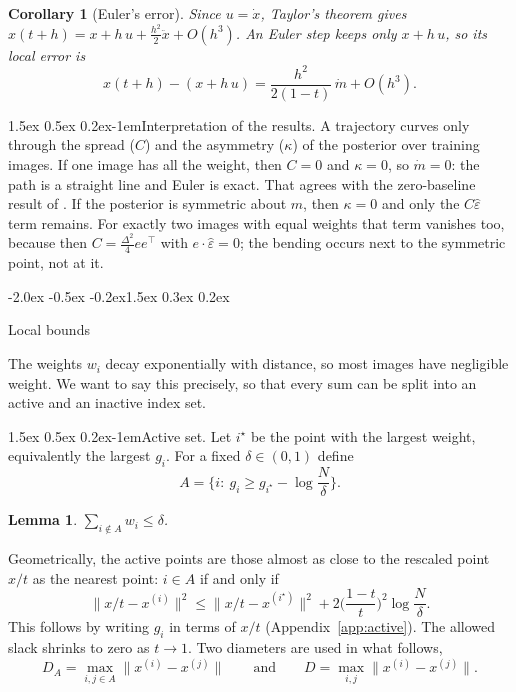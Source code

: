 \documentclass{article}
\makeatletter
\renewcommand{\normalsize}{\fontsize{10pt}{11pt}\selectfont}
\renewcommand{\section}{\@startsection{section}{1}{\z@}%
  {-2.0ex \@plus -0.5ex \@minus -0.2ex}{1.5ex \@plus 0.3ex \@minus 0.2ex}{\large\bfseries\raggedright}}
\renewcommand{\paragraph}{\@startsection{paragraph}{4}{\z@}%
  {1.5ex \@plus 0.5ex \@minus 0.2ex}{-1em}{\normalsize\bfseries}}
\newtheorem{lemma}{Lemma}
\newtheorem{corollary}{Corollary}
\theoremstyle{remark}
\newcommand{\xn}[1]{x^{(#1)}}
\newcommand{\eps}{\hat\varepsilon}
\makeatother
\begin{document}
\begin{corollary}[Euler's error]\label{cor:euler}
Since $u = \dot x$, Taylor's theorem gives $x(t + h) = x + h\,u + \frac{h^2}{2}\ddot x + O(h^3)$. An Euler step keeps only $x + h\,u$, so its local error is
\begin{equation}\label{eq:euler}
  x(t + h) - (x + h\,u) = \frac{h^2}{2(1 - t)}\,\dot m + O(h^3).
\end{equation}
\end{corollary}

\paragraph{Interpretation of the results.} A trajectory curves only through the spread ($C$) and the asymmetry ($\kappa$) of the posterior over training images. If one image has all the weight, then $C = 0$ and $\kappa = 0$, so $\dot m = 0$: the path is a straight line and Euler is exact. That agrees with the zero-baseline result of \citet{rao2026geometry}. If the posterior is symmetric about $m$, then $\kappa = 0$ and only the $C\eps$ term remains. For exactly two images with equal weights that term vanishes too, because then $C = \frac{\Delta^2}{4}ee^\top$ with $e \cdot \eps = 0$; the bending occurs next to the symmetric point, not at it.

\section{Local bounds}\label{sec:bounds}

The weights $w_i$ decay exponentially with distance, so most images have negligible weight. We want to say this precisely, so that every sum can be split into an active and an inactive index set.

\paragraph{Active set.} Let $i^\star$ be the point with the largest weight, equivalently the largest $g_i$. For a fixed $\delta \in (0,1)$ define
\begin{equation}\label{eq:active}
  A = \Big\{i:\ g_i \ge g_{i^\star} - \log\frac{N}{\delta}\Big\}.
\end{equation}
\begin{lemma}\label{lem:tail}
$\sum_{i \notin A}w_i \le \delta$.
\end{lemma}
Geometrically, the active points are those almost as close to the rescaled point $x/t$ as the nearest point: $i \in A$ if and only if
$$
  \|x/t - \xn{i}\|^2 \le \|x/t - \xn{i^\star}\|^2 + 2\Big(\frac{1 - t}{t}\Big)^2\log\frac N\delta .
$$
This follows by writing $g_i$ in terms of $x/t$ (Appendix~\ref{app:active}). The allowed slack shrinks to zero as $t \to 1$. Two diameters are used in what follows,
\[
  D_A = \max_{i,j \in A}\|\xn{i} - \xn{j}\|\qquad\text{and}\qquad D = \max_{i,j}\|\xn{i} - \xn{j}\|.
\]
\end{document}
